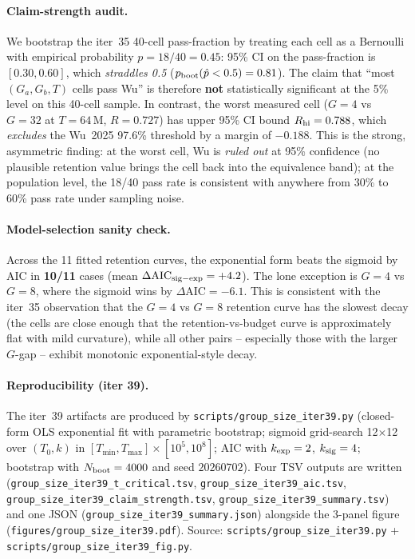 \paragraph{Claim-strength audit.}
We bootstrap the iter~35 40-cell pass-fraction by treating each cell
as a Bernoulli with empirical probability $p = 18/40 = 0.45$:
95\% CI on the pass-fraction is $[0.30, 0.60]$, which \emph{straddles
0.5} ($p_{\rm boot}(\hat p < 0.5) = 0.81$). The claim that ``most
$(G_a, G_b, T)$ cells pass Wu'' is therefore \textbf{not} statistically
significant at the 5\% level on this 40-cell sample. In contrast,
the worst measured cell ($G{=}4$ vs $G{=}32$ at $T{=}64$\,M,
$R{=}0.727$) has upper 95\% CI bound $R_{\rm hi} = 0.788$, which
\emph{excludes} the Wu~2025 97.6\% threshold by a margin of $-0.188$.
This is the strong, asymmetric finding: at the worst cell, Wu is
\emph{ruled out} at 95\% confidence (no plausible retention value
brings the cell back into the equivalence band); at the population
level, the 18/40 pass rate is consistent with anywhere from 30\% to
60\% pass rate under sampling noise.

\paragraph{Model-selection sanity check.}
Across the 11 fitted retention curves, the exponential form beats the
sigmoid by AIC in \textbf{10/11} cases (mean
$\Delta\mathrm{AIC}_{\rm sig - \exp} = +4.2$). The lone exception is
$G{=}4$ vs $G{=}8$, where the sigmoid wins by $\Delta\mathrm{AIC} = -6.1$.
This is consistent with the iter~35 observation that the $G{=}4$ vs
$G{=}8$ retention curve has the slowest decay (the cells are close
enough that the retention-vs-budget curve is approximately flat with
mild curvature), while all other pairs -- especially those with the
larger $G$-gap -- exhibit monotonic exponential-style decay.

\paragraph{Reproducibility (iter 39).}
The iter~39 artifacts are produced by
\texttt{scripts/group\_size\_iter39.py} (closed-form OLS
exponential fit with parametric bootstrap; sigmoid grid-search
12$\times$12 over $(T_0, k)$ in
$[T_{\min}, T_{\max}] \times [10^5, 10^8]$; AIC with $k_{\rm exp}=2$,
$k_{\rm sig}=4$; bootstrap with $N_{\rm boot}=4000$ and seed
$20260702$). Four TSV outputs are written
(\texttt{group\_size\_iter39\_t\_critical.tsv},
\texttt{group\_size\_iter39\_aic.tsv},
\texttt{group\_size\_iter39\_claim\_strength.tsv},
\texttt{group\_size\_iter39\_summary.tsv}) and one JSON
(\texttt{group\_size\_iter39\_summary.json}) alongside the
3-panel figure (\texttt{figures/group\_size\_iter39.pdf}). Source:
\texttt{scripts/group\_size\_iter39.py} + \texttt{scripts/group\_size\_iter39\_fig.py}.


